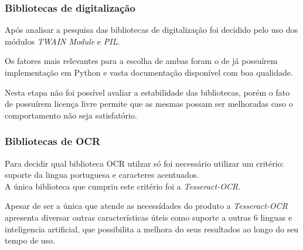 \subsubsection{Bibliotecas de digitalização}
Após analisar a pesquisa das bibliotecas de digitalização foi decidido pelo
uso dos módulos \emph{TWAIN Module} e \emph{PIL}.

Os fatores mais relevantes para a escolha de ambas foram o de já possuírem 
implementação em Python e vasta documentação disponível com boa qualidade.

Nesta etapa não foi possível avaliar a estabilidade das bibliotecas, porém
o fato de possuírem licença livre permite que as mesmas possam ser
melhoradas caso o comportamento não seja satisfatório.

\subsubsection{Bibliotecas de OCR}
Para decidir qual biblioteca OCR utilzar só foi necessário utilizar um critério:
suporte da lingua portuguesa e caracteres acentuados.\\ 
A única biblioteca que cumpriu este critério foi a \emph{Tesseract-OCR}.

Apesar de ser a única que atende as necessídades do produto a
\emph{Tesseract-OCR} apresenta diversar outras características úteis como
suporte a outras 6 linguas e inteligencia artificial, que possibilita a
melhora do seus resultados ao longo do seu tempo de uso. 
